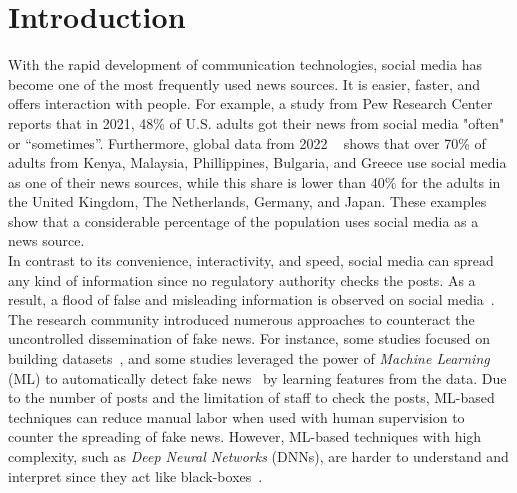 
\chapter{Introduction}\label{chapter:introduction}

With the rapid development of communication technologies, social media has become one of the most frequently used news sources. It is easier, faster, and offers interaction with people.
For example, a study from Pew Research Center ~\parencite{NewsConsumptionAcrossSocialMedia_pewresearch}
reports that in 2021, 48\% of U.S. adults got their news from social media "often" or “sometimes”. Furthermore, global data from 2022
~\parencite{StatistaUsageOfSocialMedia_Watson} shows that over 70\% of adults from Kenya, Malaysia,
Phillippines, Bulgaria, and Greece use social media as one of their news sources, while this share is lower than 40\% for the
adults in the United Kingdom, The Netherlands, Germany, and Japan. These examples show that a considerable percentage of the population uses
social media as a news source.\\
In contrast to its convenience, interactivity, and speed, social media can spread any kind of information since no regulatory authority
checks the posts. As a result, a flood of false and misleading information is observed on social
media~\parencite{SocialMediaAndFakeNewsIn2016Election_Allcott}.\\
The research community introduced numerous approaches to counteract the uncontrolled dissemination of fake news. For instance, some studies
focused on building datasets~\parencite{FakeNewsDetectionOnSocialMediaADataMiningPerspective_Shu, LiarLiarPantsOnFire_Wang, FakeReddit_Nakamura, SomeLikeItHoaxDataset_Tacchini, BuzzfaceDataset_Santia, UPFD_Dataset_Shu}, and some studies leveraged the power of \emph{Machine Learning} (ML) to
automatically detect fake news~\parencite{FakeNewsDetectionUsingGeometricDeepLearning_Monti, GraphNeuralNetworksWithContinualLearningFakeNewsDetection_Han, RumorDetectionBidirectionalGraphConvolutionalNetworks_Bian, SAFEFND_Zhou}
by learning features from the data. Due to the number of posts and the limitation of staff to check the posts, ML-based techniques can reduce manual labor when used with human supervision to counter the spreading of fake news. However, ML-based techniques with high complexity, such as \emph{Deep Neural Networks} (DNNs), are harder to understand and interpret since they act like black-boxes~\parencite{CanWeOpenTheBlackBoxOfAI_Castelvecchi}.\\
